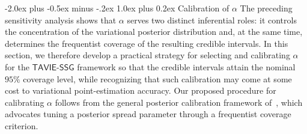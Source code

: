 \documentclass[12pt]{article}
\makeatletter
\def\section{\@startsection{section}{1}{\z@}
  {-2.0ex plus -0.5ex minus -.2ex} %
  {1.0ex plus 0.2ex}               %
  {\normalfont\Large\bfseries}}
\numberwithin{equation}{section}
\newcommand{\tssg}{\mathsf{TAVIE}\text{-}\mathsf{SSG}}
\makeatother
\begin{document}
{

\section{Calibration of \texorpdfstring{$\alpha$}{alpha}}\label{sec:calibration-alpha}
The preceding sensitivity analysis shows that $\alpha$ serves two distinct inferential roles: it controls the concentration of the variational posterior distribution and, at the same time, determines the frequentist coverage of the resulting credible intervals. In this section, we therefore develop a practical strategy for selecting and calibrating $\alpha$ for the $\tssg$ framework so that the credible intervals attain the nominal $95\%$ coverage level, while recognizing that such calibration may come at some cost to variational point-estimation accuracy. Our proposed procedure for calibrating $\alpha$ follows from the general posterior calibration framework of~\cite{SyringMartin2019}, which advocates tuning a posterior spread parameter through a frequentist coverage criterion.

}
\end{document}
